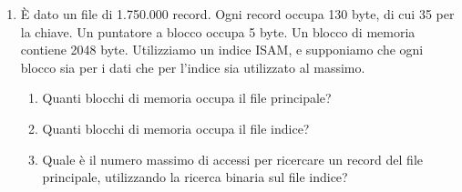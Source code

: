 \begin{enumerate}
\begin{enumerate}
    \end{enumerate}
    \item \`E dato un file di 1.750.000 record. Ogni record occupa 130 byte, di cui 35 per la chiave. Un puntatore a blocco occupa 5 byte. Un blocco di memoria contiene 2048 byte. Utilizziamo un indice ISAM, e supponiamo che ogni blocco sia per i dati che per l'indice sia utilizzato al massimo.
    \begin{enumerate}
        \item Quanti blocchi di memoria occupa il file principale?
        \item Quanti blocchi di memoria occupa il file indice?
        \item Quale \`e il numero massimo di accessi per ricercare un record del file principale,  utilizzando la ricerca binaria sul file indice?
    \end{enumerate}
\end{enumerate}